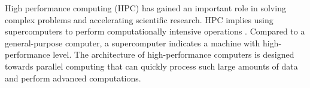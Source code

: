 \noindent High performance computing (HPC) has gained an important role in solving complex problems and accelerating scientific research. HPC implies using supercomputers to perform computationally intensive operations \cite{sterling2018hpc}. Compared to a general-purpose computer, a supercomputer indicates a machine with high-performance level. The architecture of high-performance computers is designed towards parallel computing that can quickly process such large amounts of data and perform advanced computations.\\

